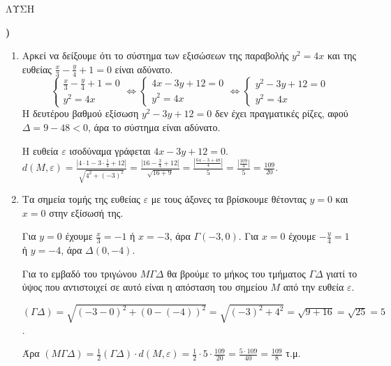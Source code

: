 ΛΥΣΗ


\textbf{\alpha)}
\begin{enumerate}
    \item Αρκεί να δείξουμε ότι το σύστημα των εξισώσεων της παραβολής $y^2 = 4x$ και της ευθείας $\frac{x}{3} - \frac{y}{4} + 1 = 0$ είναι αδύνατο.
    \[
    \left\{
    \begin{array}{l}
    \frac{x}{3} - \frac{y}{4} + 1 = 0 \\
    y^2 = 4x
    \end{array}
    \right.
    \Leftrightarrow
    \left\{
    \begin{array}{l}
    4x - 3y + 12 = 0 \\
    y^2 = 4x
    \end{array}
    \right.
    \Leftrightarrow
    \left\{
    \begin{array}{l}
    y^2 - 3y + 12 = 0 \\
    y^2 = 4x
    \end{array}
    \right.
    \]
    Η δευτέρου βαθμού εξίσωση $y^2 - 3y + 12 = 0$ δεν έχει πραγματικές ρίζες, αφού $\Delta = 9 - 48 < 0$, άρα το σύστημα είναι αδύνατο.

    Η ευθεία $\varepsilon$ ισοδύναμα γράφεται $4x - 3y + 12 = 0$.
    $d(M, \varepsilon) = \frac{|4\cdot 1 - 3\cdot \frac{1}{4} + 12|}{\sqrt{4^2+(-3)^2}} = \frac{|16 - \frac{3}{4} + 12|}{\sqrt{16+9}} = \frac{|\frac{64-3+48}{4}|}{5} = \frac{|\frac{109}{4}|}{5} = \frac{109}{20}$.

    \item Τα σημεία τομής της ευθείας $\varepsilon$ με τους άξονες τα βρίσκουμε θέτοντας $y=0$ και $x=0$ στην εξίσωσή της.

    Για $y=0$ έχουμε $\frac{x}{3} = -1$ ή $x=-3$, άρα $\Gamma(-3, 0)$.
    Για $x=0$ έχουμε $-\frac{y}{4} = 1$ ή $y=-4$, άρα $\Delta(0, -4)$.

    Για το εμβαδό του τριγώνου $M\Gamma\Delta$ θα βρούμε το μήκος του τμήματος $\Gamma\Delta$ γιατί το ύψος που αντιστοιχεί σε αυτό είναι η απόσταση του σημείου $M$ από την ευθεία $\varepsilon$.

    $(\Gamma\Delta) = \sqrt{(-3-0)^2 + (0-(-4))^2} = \sqrt{(-3)^2 + 4^2} = \sqrt{9+16} = \sqrt{25} = 5$.

    Άρα $(M\Gamma\Delta) = \frac{1}{2}(\Gamma\Delta) \cdot d(M, \varepsilon) = \frac{1}{2} \cdot 5 \cdot \frac{109}{20} = \frac{5 \cdot 109}{40} = \frac{109}{8}$ τ.μ.
\end{enumerate}

